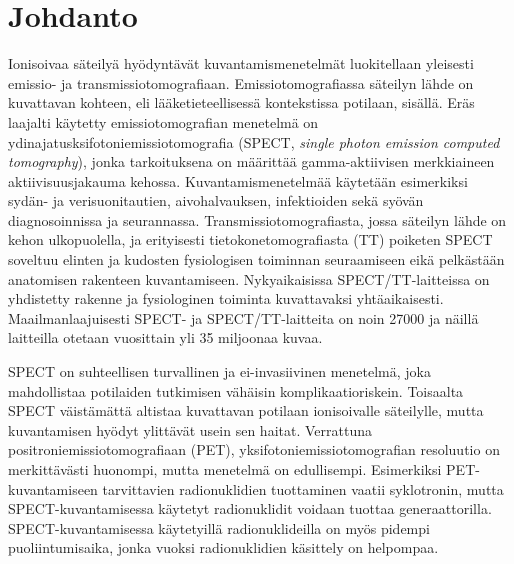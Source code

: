\section{Johdanto}
Ionisoivaa säteilyä hyödyntävät kuvantamismenetelmät luokitellaan yleisesti emissio- ja transmissiotomografiaan. Emissiotomografiassa säteilyn lähde on kuvattavan kohteen, eli lääketieteellisessä kontekstissa potilaan, sisällä. Eräs laajalti käytetty emissiotomografian menetelmä on ydinajatusksifotoniemissiotomografia (SPECT, \textit{single photon emission computed tomography}), jonka tarkoituksena on määrittää gamma-aktiivisen merkkiaineen aktiivisuusjakauma kehossa\cite{bruyant_analytic_2002}. Kuvantamismenetelmää käytetään esimerkiksi sydän- ja verisuonitautien, aivohalvauksen, infektioiden sekä syövän diagnosoinnissa ja seurannassa.\cite{cherry_single_2012, van_audenhaege_review_2015, crisan_radiopharmaceuticals_2022, ljungberg_spectct_2018} Transmissiotomografiasta, jossa säteilyn lähde on kehon ulkopuolella\cite{bercovich_medical_2018}, ja erityisesti tietokonetomografiasta (TT) poiketen SPECT soveltuu elinten ja kudosten fysiologisen toiminnan seuraamiseen eikä pelkästään anatomisen rakenteen kuvantamiseen\cite{bercovich_medical_2018, crisan_radiopharmaceuticals_2022, cherry_single_2012}. Nykyaikaisissa SPECT/TT-laitteissa on yhdistetty rakenne ja fysiologinen toiminta kuvattavaksi yhtäaikaisesti\cite{hutton_origins_2014, cherry_single_2012, bercovich_medical_2018, ljungberg_spectct_2018}. Maailmanlaajuisesti SPECT- ja SPECT/TT-laitteita on noin 27000\cite{cutler_global_2021} ja näillä laitteilla otetaan vuosittain yli 35 miljoonaa kuvaa\cite{oecd_supply_2019}.

SPECT on suhteellisen turvallinen ja ei-invasiivinen menetelmä, joka mahdollistaa potilaiden tutkimisen vähäisin komplikaatioriskein. Toisaalta SPECT väistämättä altistaa kuvattavan potilaan ionisoivalle säteilylle, mutta kuvantamisen hyödyt ylittävät usein sen haitat.\cite{ljungberg_spectct_2018} Verrattuna positroniemissiotomografiaan (PET), yksifotoniemissiotomografian resoluutio on merkittävästi huonompi, mutta menetelmä on edullisempi\cite{crisan_radiopharmaceuticals_2022, cherry_single_2012}. Esimerkiksi PET-kuvantamiseen tarvittavien radionuklidien tuottaminen vaatii syklotronin, mutta SPECT-kuvantamisessa käytetyt radionuklidit voidaan tuottaa generaattorilla. SPECT-kuvantamisessa käytetyillä radionuklideilla on myös pidempi puoliintumisaika, jonka vuoksi radionuklidien käsittely on helpompaa.\cite{crisan_radiopharmaceuticals_2022}

